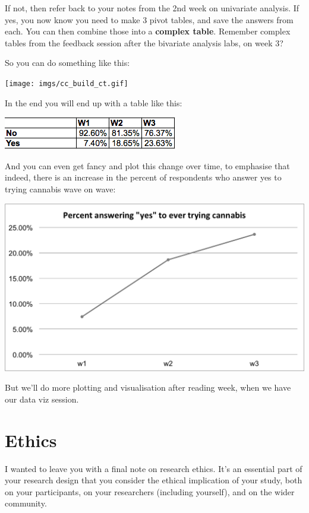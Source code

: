 \documentclass[]{book}
\theoremstyle{definition}
\theoremstyle{definition}
\theoremstyle{definition}
\theoremstyle{remark}
\begin{document}
If not, then refer back to your notes from the 2nd week on univariate
analysis. If yes, you now know you need to make 3 pivot tables, and save
the answers from each. You can then combine those into a \textbf{complex
table}. Remember complex tables from the feedback session after the
bivariate analysis labs, on week 3?

So you can do something like this:

\texttt{[image: imgs/cc\_build\_ct.gif]}

In the end you will end up with a table like this:

\includegraphics{imgs/final_cc_ct.png}

And you can even get fancy and plot this change over time, to emphasise
that indeed, there is an increase in the percent of respondents who
answer yes to trying cannabis wave on wave:

\includegraphics{imgs/incr_yes_can.png}

But we'll do more plotting and visualisation after reading week, when we
have our data viz session.

\hypertarget{ethics}{%
\section{Ethics}\label{ethics}}

I wanted to leave you with a final note on research ethics. It's an
essential part of your research design that you consider the ethical
implication of your study, both on your participants, on your
researchers (including yourself), and on the wider community.
\end{document}
